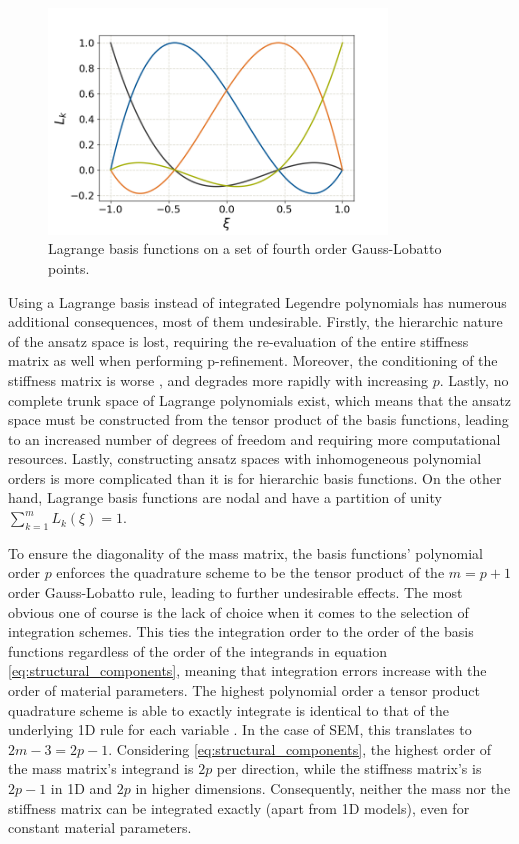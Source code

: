 \begin{figure}[h]
	\centering
	\includegraphics[height=6cm]{pictures/figures/lagrange_basis.png}
	\caption{Lagrange basis functions on a set of fourth order Gauss-Lobatto points.}
	\label{fig:lagrange_basis}
\end{figure}

Using a Lagrange basis instead of integrated Legendre polynomials has numerous additional consequences, most of them undesirable. Firstly, the hierarchic nature of the ansatz space is lost, requiring the re-evaluation of the entire stiffness matrix as well when performing p-refinement. Moreover, the conditioning of the stiffness matrix is worse \cite{Zumbusch1996}, and degrades more rapidly with increasing $p$. Lastly, no complete trunk space of Lagrange polynomials exist, which means that the ansatz space must be constructed from the tensor product of the basis functions, leading to an increased number of degrees of freedom and requiring more computational resources. Lastly, constructing ansatz spaces with inhomogeneous polynomial orders is more complicated than it is for hierarchic basis functions.
On the other hand, Lagrange basis functions are nodal and have a partition of unity $\sum_{k=1}^m L_k(\xi) = 1$.

To ensure the diagonality of the mass matrix, the basis functions' polynomial order $p$ enforces the quadrature scheme to be the tensor product of the $m=p+1$ order Gauss-Lobatto rule, leading to further undesirable effects. The most obvious one of course is the lack of choice when it comes to the selection of integration schemes. This ties the integration order to the order of the basis functions regardless of the order of the integrands in equation \ref{eq:structural_components}, meaning that integration errors increase with the order of material parameters. The highest polynomial order a tensor product quadrature scheme is able to exactly integrate is identical to that of the underlying 1D rule for each variable \cite{Keister1996}. In the case of SEM, this translates to $2m-3=2p-1$. Considering \ref{eq:structural_components}, the highest order of the mass matrix's integrand is $2p$ per direction, while the stiffness matrix's is $2p-1$ in 1D and $2p$ in higher dimensions. Consequently, neither the mass nor the stiffness matrix can be integrated exactly (apart from 1D models), even for constant material parameters.

